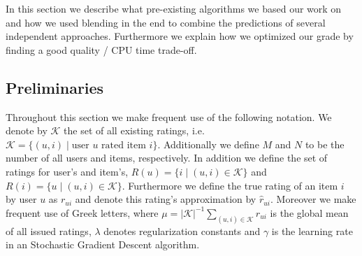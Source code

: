 \documentclass[10pt,conference,compsocconf]{IEEEtran}
\newcommand{\abs}[1]{\left\lvert#1\right\rvert}
\begin{document}


In this section we describe what pre-existing algorithms we based our work on
and how we used blending in the end to combine the predictions of several
independent approaches. Furthermore we explain how we optimized our grade by
finding a good quality / CPU time trade-off.

\subsection{Preliminaries}
\label{sub:preliminaries}

Throughout this section we make frequent use of the following notation. We
denote by $\mathcal K$ the set of all existing ratings, i.e.\ $\mathcal K =
\{(u,i) \mid \text{user $u$ rated item $i$}\}$. Additionally we define $M$ and
$N$ to be the number of all users and items, respectively. In addition we define
the set of ratings for user's and item's, $R(u) = \{i \mid (u,i) \in \mathcal
K\}$ and $R(i) = \{u \mid (u,i) \in \mathcal K\}$. Furthermore we define the
true rating of an item $i$ by user $u$ as $r_{ui}$ and denote this rating's
approximation by $\hat{r}_{ui}$. Moreover we make frequent use of Greek letters,
where $\mu = \abs{\mathcal K}^{-1} \sum_{(u,i) \in \mathcal K} r_{ui}$ is the
global mean of all issued ratings, $\lambda$ denotes regularization constants
and $\gamma$ is the learning rate in an Stochastic Gradient Descent algorithm.
\end{document}
